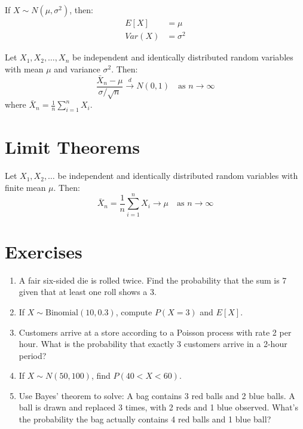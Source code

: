 \begin{theorem}
If $X \sim N(\mu, \sigma^2)$, then:
\begin{align}
E[X] &= \mu \\
Var(X) &= \sigma^2
\end{align}
\end{theorem}

\begin{theorem}
Let $X_1, X_2, \ldots, X_n$ be independent and identically distributed random variables with mean $\mu$ and variance $\sigma^2$. Then:
\[\frac{\bar{X}_n - \mu}{\sigma/\sqrt{n}} \xrightarrow{d} N(0, 1) \quad \text{as } n \to \infty\]
where $\bar{X}_n = \frac{1}{n}\sum_{i=1}^n X_i$.
\end{theorem}

\section{Limit Theorems}

\begin{theorem}
Let $X_1, X_2, \ldots$ be independent and identically distributed random variables with finite mean $\mu$. Then:
\[\bar{X}_n = \frac{1}{n}\sum_{i=1}^n X_i \to \mu \quad \text{as } n \to \infty\]
\end{theorem}

\section{Exercises}

\begin{enumerate}
    \item A fair six-sided die is rolled twice. Find the probability that the sum is 7 given that at least one roll shows a 3.
    
    \item If $X \sim \text{Binomial}(10, 0.3)$, compute $P(X = 3)$ and $E[X]$.
    
    \item Customers arrive at a store according to a Poisson process with rate 2 per hour. What is the probability that exactly 3 customers arrive in a 2-hour period?
    
    \item If $X \sim N(50, 100)$, find $P(40 < X < 60)$.
    
    \item Use Bayes' theorem to solve: A bag contains 3 red balls and 2 blue balls. A ball is drawn and replaced 3 times, with 2 reds and 1 blue observed. What's the probability the bag actually contains 4 red balls and 1 blue ball?
\end{enumerate}
